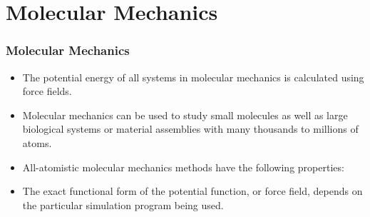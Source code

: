 \documentclass[slidestop,mathserif,compress,xcolor=svgnames]{beamer}
\begin{document}
\section{Molecular Mechanics}
\begin{frame}
\frametitle{\small Molecular Mechanics}
\footnotesize{
\begin{itemize}
\item The potential energy of all systems in molecular mechanics is calculated using force fields. 
\item Molecular mechanics can be used to study small molecules as well as large biological systems or material assemblies with many thousands to millions of atoms.
\item All-atomistic molecular mechanics methods have the following properties:
\item The exact functional form of the potential function, or force field, depends on the particular simulation program being used. 
\end{itemize}
}
\end{frame}
\end{document}
